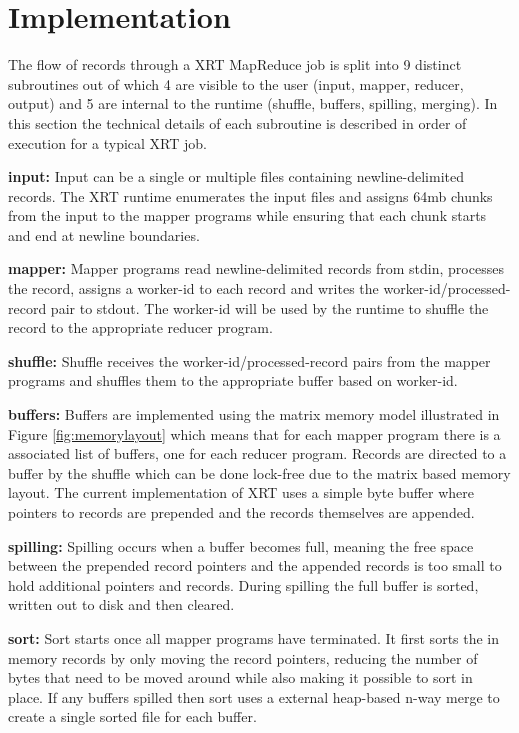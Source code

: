 \documentclass[twocolumn,11px]{article}       %
\begin{document}
\section{Implementation} \label{sec:impl}

The flow of records through a XRT MapReduce job is split into 9 distinct subroutines out of which 4 are visible to the user (input, mapper, reducer, output) and 5 are internal to the runtime (shuffle, buffers, spilling, merging).
In this section the technical details of each subroutine is described in order of execution for a typical XRT job.

\bigskip
\noindent
\textbf{input:} Input can be a single or multiple files containing newline-delimited records.
The XRT runtime enumerates the input files and assigns 64mb chunks from the input to the mapper programs while ensuring that each chunk starts and end at newline boundaries.

\bigskip
\noindent
\textbf{mapper:} Mapper programs read newline-delimited records from stdin, processes the record, assigns a worker-id to each record and writes the worker-id/processed-record pair to stdout.
The worker-id will be used by the runtime to shuffle the record to the appropriate reducer program.

\bigskip
\noindent
\textbf{shuffle:} Shuffle receives the worker-id/processed-record pairs from the mapper programs and shuffles them to the appropriate buffer based on worker-id.

\bigskip
\noindent
\textbf{buffers:} Buffers are implemented using the matrix memory model illustrated in Figure \ref{fig:memorylayout} which means that for each mapper program there is a associated list of buffers, one for each reducer program.
Records are directed to a buffer by the shuffle which can be done lock-free due to the matrix based memory layout.
The current implementation of XRT uses a simple byte buffer where pointers to records are prepended and the records themselves are appended.

\bigskip
\noindent
\textbf{spilling:} Spilling occurs when a buffer becomes full, meaning the free space between the prepended record pointers and the appended records is too small to hold additional pointers and records.
During spilling the full buffer is sorted, written out to disk and then cleared.

\bigskip
\noindent
\textbf{sort:} Sort starts once all mapper programs have terminated.
It first sorts the in memory records by only moving the record pointers, reducing the number of bytes that need to be moved around while also making it possible to sort in place.
If any buffers spilled then sort uses a external heap-based n-way merge to create a single sorted file for each buffer.
\end{document}
